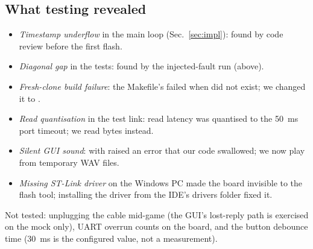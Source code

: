 \subsection{What testing revealed}
\begin{itemize}\setlength\itemsep{0pt}
\item \emph{Timestamp underflow} in the main loop (Sec.~\ref{sec:impl}): found by code review before the first flash.
\item \emph{Diagonal gap} in the tests: found by the injected-fault run (above).
\item \emph{Fresh-clone build failure}: the Makefile's  failed when  did not exist; we changed it to .
\item \emph{Read quantisation} in the test link: read latency was quantised to the 50~ms port timeout; we read  bytes instead.
\item \emph{Silent GUI sound}:  with  raised an error that our code swallowed; we now play from temporary WAV files. 
\item \emph{Missing ST-Link driver} on the Windows PC made the board invisible to the flash tool; installing the driver from the IDE's drivers folder fixed it.
\end{itemize}
Not tested: unplugging the cable mid-game (the GUI's lost-reply path is exercised on the mock only), UART overrun counts on the board, and the
button debounce time (30~ms is the configured value, not a measurement). 
